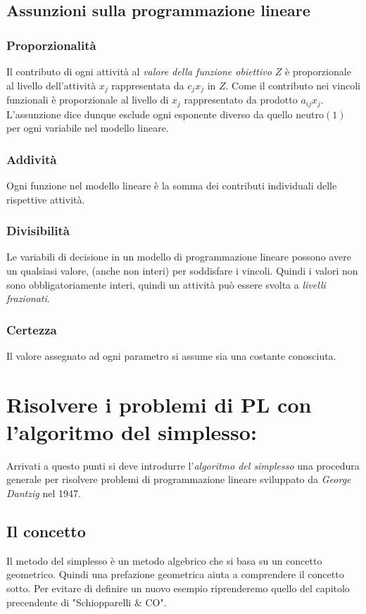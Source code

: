 \documentclass{article}
\begin{document}
\subsection{Assunzioni sulla programmazione lineare}

\subsubsection{Proporzionalità}
Il contributo di ogni attività al \textit{valore della funzione obiettivo $Z$} è proporzionale al livello dell'attività $x_j$ rappresentata da $c_jx_j$ in $Z$. Come il contributo nei vincoli funzionali è proporzionale al livello di $x_j$ rappresentato da prodotto $a_{ij}x_j$. L'assunzione dice dunque esclude ogni esponente diverso da quello neutro$(1)$ per ogni variabile nel modello lineare.

\subsubsection{Addività}
Ogni funzione nel modello lineare è la somma dei contributi individuali delle rispettive attività.

\subsubsection{Divisibilità}
Le variabili di decisione in un modello di programmazione lineare possono avere un qualsiasi valore, (anche non interi) per soddisfare i vincoli. Quindi i valori non sono obbligatoriamente interi, quindi un attività può essere svolta a \textit{livelli frazionati}.

\subsubsection{Certezza}
Il valore assegnato ad ogni parametro si assume sia una costante conosciuta.

\section{Risolvere i problemi di PL con l'algoritmo del simplesso:}
Arrivati a questo punti si deve introdurre l'\textit{algoritmo del simplesso} una procedura generale per risolvere problemi di programmazione lineare sviluppato da \textit{George Dantzig} nel 1947.

\subsection{Il concetto}
Il metodo del simplesso è un metodo algebrico che si basa su un concetto geometrico. Quindi una prefazione geometrica aiuta a comprendere il concetto sotto. Per evitare di definire un nuovo esempio riprenderemo quello del capitolo precendente di "Schiopparelli \& CO".
\end{document}
